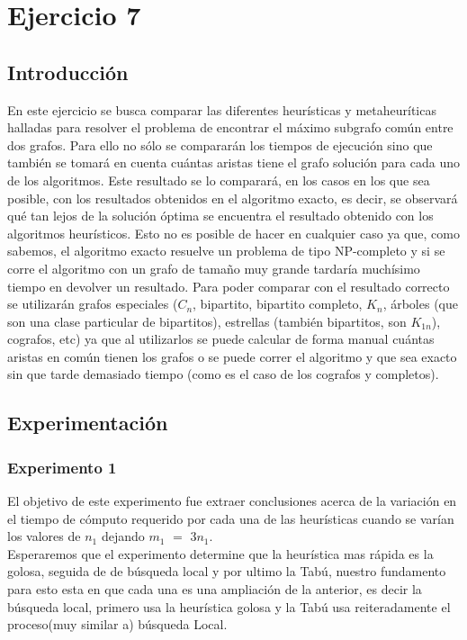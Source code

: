   \section{Ejercicio 7}

\subsection{Introducción}
En este ejercicio se busca comparar las diferentes heurísticas y metaheuríticas halladas para resolver el problema de encontrar el máximo subgrafo común entre dos grafos. Para ello no sólo se compararán los tiempos de ejecución sino que también se tomará en cuenta cuántas aristas tiene el grafo solución para cada uno de los algoritmos. Este resultado se lo comparará, en los casos en los que sea posible, con los resultados obtenidos en el algoritmo exacto, es decir, se observará qué tan lejos de la solución óptima se encuentra el resultado obtenido con los algoritmos heurísticos. Esto no es posible de hacer en cualquier caso ya que, como sabemos, el algoritmo exacto resuelve un problema de tipo NP-completo y si se corre el algoritmo con un grafo de tamaño muy grande tardaría muchísimo tiempo en devolver un resultado. Para poder comparar con el resultado correcto se utilizarán grafos especiales ($C_n$, bipartito, bipartito completo, $K_n$, árboles (que son una clase particular de bipartitos), estrellas (también bipartitos, son $K_{1n}$), cografos, etc) ya que al utilizarlos se puede calcular de forma manual cuántas aristas en común tienen los grafos o se puede correr el algoritmo y que sea exacto sin que tarde demasiado tiempo (como es el caso de los cografos y completos).

\subsection{Experimentación}
    
\subsubsection*{Experimento 1}\;
 El objetivo de este experimento fue extraer conclusiones acerca de la variación en el tiempo de cómputo requerido por cada una de las heurísticas cuando se varían los valores de $n_1$ dejando $m_1$ $=$ 3$n_1$. \\
 Esperaremos que el experimento determine que la heurística mas rápida es la golosa, seguida de de búsqueda local y por ultimo la Tabú, nuestro fundamento para esto esta en que cada una es una ampliación de la anterior, es decir la búsqueda local, primero usa la heurística golosa y la Tabú usa reiteradamente el proceso(muy similar a) búsqueda Local.\\

